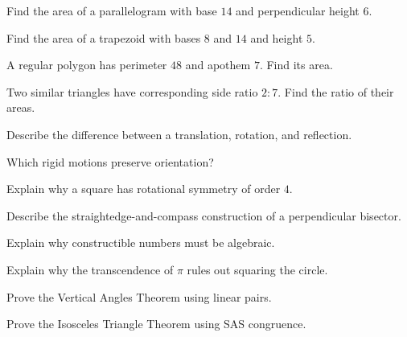 \begin{exercise}[1]
Find the area of a parallelogram with base \(14\) and perpendicular height
\(6\).
\end{exercise}

\begin{exercise}[1]
Find the area of a trapezoid with bases \(8\) and \(14\) and height \(5\).
\end{exercise}

\begin{exercise}[2]
A regular polygon has perimeter \(48\) and apothem \(7\). Find its area.
\end{exercise}

\begin{exercise}[2]
Two similar triangles have corresponding side ratio \(2:7\). Find the ratio
of their areas.
\end{exercise}

\begin{exercise}[2]
Describe the difference between a translation, rotation, and reflection.
\end{exercise}

\begin{exercise}[2]
Which rigid motions preserve orientation?
\end{exercise}

\begin{exercise}[2]
Explain why a square has rotational symmetry of order \(4\).
\end{exercise}

\begin{exercise}[2]
Describe the straightedge-and-compass construction of a perpendicular
bisector.
\end{exercise}

\begin{exercise}[2]
Explain why constructible numbers must be algebraic.
\end{exercise}

\begin{exercise}[2]
Explain why the transcendence of \(\pi\) rules out squaring the circle.
\end{exercise}

\begin{exercise}[3]
Prove the Vertical Angles Theorem using linear pairs.
\end{exercise}

\begin{exercise}[3]
Prove the Isosceles Triangle Theorem using SAS congruence.
\end{exercise}

